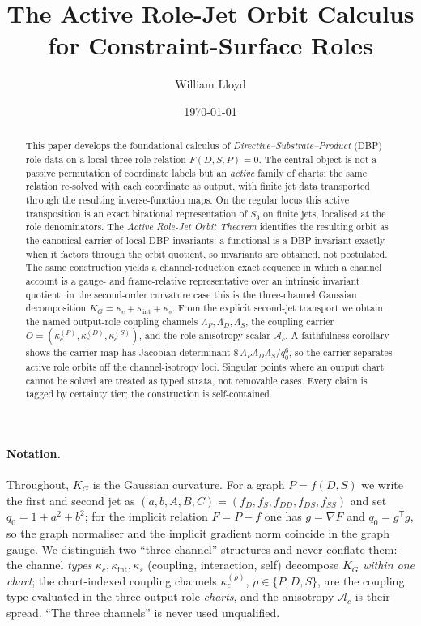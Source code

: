 \documentclass[11pt]{article}
\title{\textbf{The Active Role-Jet Orbit Calculus for Constraint-Surface Roles}}
\author{William Lloyd}
\date{\today}
\theoremstyle{plain}
\theoremstyle{definition}
\newcommand{\KG}{K_{G}}
\newcommand{\Ac}{\mathcal{A}_c}
\newcommand{\kc}{\kappa_{c}}
\newcommand{\kint}{\kappa_{\mathrm{int}}}
\newcommand{\ks}{\kappa_{s}}
\newcommand{\kcrole}[1]{\kappa_{c}^{(#1)}}   %
\begin{document}
\maketitle

\begin{abstract}
\noindent This paper develops the foundational calculus of \emph{Directive--Substrate--Product}
(DBP) role data on a local three-role relation $F(D,S,P)=0$. The central object is not a passive
permutation of coordinate labels but an \emph{active} family of charts: the same relation re-solved
with each coordinate as output, with finite jet data transported through the resulting
inverse-function maps. On the regular locus this active transposition is an exact birational
representation of $S_3$ on finite jets, localised at the role denominators. The \emph{Active
Role-Jet Orbit Theorem} identifies the resulting orbit as the canonical carrier of local DBP
invariants: a functional is a DBP invariant exactly when it factors through the orbit quotient,
so invariants are obtained, not postulated. The same construction yields a channel-reduction exact
sequence in which a channel account is a gauge- and frame-relative representative over an intrinsic
invariant quotient; in the second-order curvature case this is the three-channel Gaussian
decomposition $\KG=\kc+\kint+\ks$. From the explicit second-jet transport we obtain the named
output-role coupling channels $\Lambda_P,\Lambda_D,\Lambda_S$, the coupling carrier
$O=(\kcrole{P},\kcrole{D},\kcrole{S})$, and the role anisotropy scalar $\Ac$. A faithfulness
corollary shows the carrier map has Jacobian determinant $8\,\Lambda_P\Lambda_D\Lambda_S/q_0^6$,
so the carrier separates active role orbits off the channel-isotropy loci. Singular points where an
output chart cannot be solved are treated as typed strata, not removable cases. Every claim is
tagged by certainty tier; the construction is self-contained.
\end{abstract}

\paragraph{Notation.} Throughout, $\KG$ is the Gaussian curvature. For a graph $P=f(D,S)$ we write
the first and second jet as $(a,b,A,B,C)=(f_D,f_S,f_{DD},f_{DS},f_{SS})$ and set
$q_0=1+a^2+b^2$; for the implicit relation $F=P-f$ one has $g=\nabla F$ and $q_0=g^{\mathsf T}g$,
so the graph normaliser and the implicit gradient norm coincide in the graph gauge. We distinguish
two ``three-channel'' structures and never conflate them: the channel \emph{types}
$\kc,\kint,\ks$ (coupling, interaction, self) decompose $\KG$ \emph{within one chart}; the
chart-indexed coupling channels $\kcrole{\rho}$, $\rho\in\{P,D,S\}$, are the coupling type evaluated
in the three output-role \emph{charts}, and the anisotropy $\Ac$ is their spread. ``The three
channels'' is never used unqualified.
\end{document}
